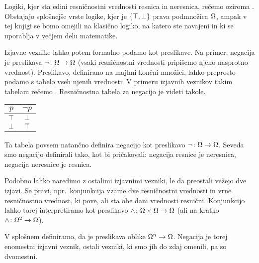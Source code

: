                 \begin{opomba}
                        Logiki, kjer sta edini resničnostni vrednosti resnica in neresnica, rečemo  oziroma . Obstajajo splošnejše vrste logike, kjer je $\set{\true, \false}$ prava podmnožica $\Omega$, ampak v tej knjigi se bomo omejili na klasično logiko, na katero ste navajeni in ki se uporablja v večjem delu matematike.
                \end{opomba}


                Izjavne veznike lahko potem formalno podamo kot preslikave. Na primer, negacija je preslikava $\lnot\colon \Omega \to \Omega$ (vsaki resničnostni vrednosti pripišemo njeno nasprotno vrednost). Preslikavo, definirano na majhni končni množici, lahko preprosto podamo s tabelo vseh njenih vrednosti. V primeru izjavnih veznikov takim tabelam rečemo . Resničnostna tabela za negacijo je videti takole.
                \begin{center}
                        \begin{tabular}{c|c}
                                $p$ & $\lnot{p}$ \\
                                \hline
                                $\top$ & $\bot$ \\
                                $\bot$ & $\top$
                        \end{tabular}
                \end{center}
                Ta tabela povsem natančno definira negacijo kot preslikavo $\lnot\colon \Omega \to \Omega$. Seveda smo negacijo definirali tako, kot bi pričakovali: negacija resnice je neresnica, negacija neresnice je resnica.

                Podobno lahko naredimo z ostalimi izjavnimi vezniki, le da preostali vežejo dve izjavi. Se pravi, npr.~konjunkcija vzame dve resničnostni vrednosti in vrne resničnostno vrednost, ki pove, ali sta obe dani vrednosti resnični. Konjunkcijo lahko torej interpretiramo kot preslikavo $\land\colon \Omega \times \Omega \to \Omega$ (ali na kratko $\land\colon \Omega^2 \to \Omega$).

                V splošnem definiramo, da je  preslikava oblike $\Omega^n \to \Omega$. Negacija je torej enomestni izjavni veznik, ostali vezniki, ki smo jih do zdaj omenili, pa so dvomestni.


